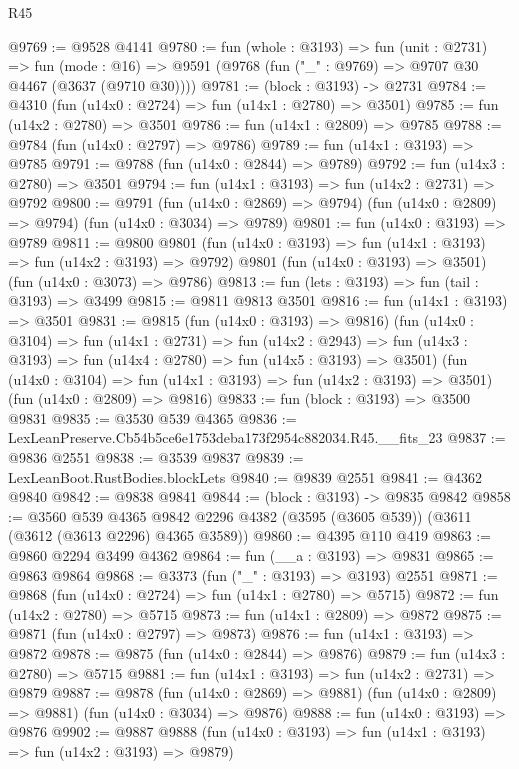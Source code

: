\begin{lexlean}{R45}
\begin{coremodule}
@9769 := @9528 @4141
@9780 := fun (whole : @3193) =>
  fun (unit : @2731) =>
  fun (mode : @16) => @9591 (@9768 (fun ("_" : @9769) => @9707 @30 @4467 (@3637 (@9710 @30))))
@9781 := (block : @3193) -> @2731
@9784 := @4310 (fun (u14x0 : @2724) => fun (u14x1 : @2780) => @3501)
@9785 := fun (u14x2 : @2780) => @3501
@9786 := fun (u14x1 : @2809) => @9785
@9788 := @9784 (fun (u14x0 : @2797) => @9786)
@9789 := fun (u14x1 : @3193) => @9785
@9791 := @9788 (fun (u14x0 : @2844) => @9789)
@9792 := fun (u14x3 : @2780) => @3501
@9794 := fun (u14x1 : @3193) => fun (u14x2 : @2731) => @9792
@9800 := @9791
    (fun (u14x0 : @2869) => @9794)
    (fun (u14x0 : @2809) => @9794)
    (fun (u14x0 : @3034) => @9789)
@9801 := fun (u14x0 : @3193) => @9789
@9811 := @9800
    @9801
    (fun (u14x0 : @3193) => fun (u14x1 : @3193) => fun (u14x2 : @3193) => @9792)
    @9801
    (fun (u14x0 : @3193) => @3501)
    (fun (u14x0 : @3073) => @9786)
@9813 := fun (lets : @3193) => fun (tail : @3193) => @3499
@9815 := @9811 @9813 @3501
@9816 := fun (u14x1 : @3193) => @3501
@9831 := @9815
    (fun (u14x0 : @3193) => @9816)
    (fun (u14x0 : @3104) =>
    fun (u14x1 : @2731) =>
    fun (u14x2 : @2943) =>
    fun (u14x3 : @3193) => fun (u14x4 : @2780) => fun (u14x5 : @3193) => @3501)
    (fun (u14x0 : @3104) => fun (u14x1 : @3193) => fun (u14x2 : @3193) => @3501)
    (fun (u14x0 : @2809) => @9816)
@9833 := fun (block : @3193) => @3500 @9831
@9835 := @3530 @539 @4365
@9836 := LexLeanPreserve.Cb54b5ce6e1753deba173f2954c882034.R45.__fits_23
@9837 := @9836 @2551
@9838 := @3539 @9837
@9839 := LexLeanBoot.RustBodies.blockLets
@9840 := @9839 @2551
@9841 := @4362 @9840
@9842 := @9838 @9841
@9844 := (block : @3193) -> @9835 @9842
@9858 := @3560
    @539
    @4365
    @9842
    @2296
    @4382
    (@3595 (@3605 @539))
    (@3611 (@3612 (@3613 @2296) @4365 @3589))
@9860 := @4395 @110 @419
@9863 := @9860 @2294 @3499 @4362
@9864 := fun (__a : @3193) => @9831
@9865 := @9863 @9864
@9868 := @3373 (fun ("_" : @3193) => @3193) @2551
@9871 := @9868 (fun (u14x0 : @2724) => fun (u14x1 : @2780) => @5715)
@9872 := fun (u14x2 : @2780) => @5715
@9873 := fun (u14x1 : @2809) => @9872
@9875 := @9871 (fun (u14x0 : @2797) => @9873)
@9876 := fun (u14x1 : @3193) => @9872
@9878 := @9875 (fun (u14x0 : @2844) => @9876)
@9879 := fun (u14x3 : @2780) => @5715
@9881 := fun (u14x1 : @3193) => fun (u14x2 : @2731) => @9879
@9887 := @9878
    (fun (u14x0 : @2869) => @9881)
    (fun (u14x0 : @2809) => @9881)
    (fun (u14x0 : @3034) => @9876)
@9888 := fun (u14x0 : @3193) => @9876
@9902 := @9887
    @9888
    (fun (u14x0 : @3193) => fun (u14x1 : @3193) => fun (u14x2 : @3193) => @9879)

\end{coremodule}
\end{lexlean}
